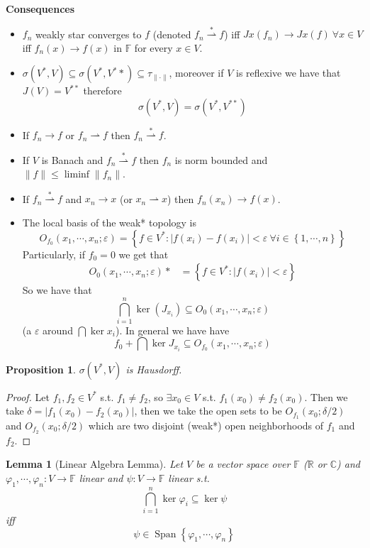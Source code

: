 \documentclass[11pt,a4paper]{article}
\theoremstyle{definition}
\theoremstyle{plain}
\newtheorem{lemma}[definition]{Lemma}
\newtheorem{proposition}[definition]{Proposition}
\theoremstyle{remark}
\newcommand{\F}{\mathbb{F}}
\newcommand{\R}{\mathbb{R}}
\newcommand{\C}{\mathbb{C}}
\renewcommand{\set}[1]{\left\{ #1 \right\}}
\newcommand{\abs}[1]{\lvert #1 \rvert}
\newcommand{\norm}[1]{\lVert #1 \rVert}
\newcommand{\1}{\mathbbm{1}}
\newcommand{\Span}{\operatorname{Span}}
\newcommand{\wto}{\rightharpoonup}
\begin{document}
\textbf{Consequences} 

\begin{itemize}
    \item $f_n$ weakly star converges to $f$ (denoted $f_n \overset{*}{\wto} f$) iff $Jx(f_n) \to Jx(f) \ \forall x \in V$ iff $f_n(x) \to f(x)$ in $\F$ for every $x \in V$.
    \item $\sigma(V^*, V) \subseteq \sigma(V^*, V^**) \subseteq \tau_{\norm{\cdot}}$, moreover if $V$ is reflexive we have that $J(V) = V^{**}$ therefore 
    $$\sigma(V^*, V) = \sigma(V^*, V^{**})$$
    \item If $f_n \to f$ or $f_n \wto f$ then $f_n \overset{*}{\wto} f$. 
    \item If $V$ is Banach and $f_n \overset{*}{\wto} f$ then $f_n$ is norm bounded and $\norm{f} \le \liminf \norm{f_n}$. 
    \item If $f_n \overset{*}{\wto} f$ and $x_n \to x$ (or $x_n \wto x$) then $f_n(x_n) \to f(x)$.  
    \item The local basis of the weak* topology is 
    $$O_{f_0} (x_1, \cdots, x_n; \varepsilon) = \set{f \in V^* \colon \abs{f(x_i) - f(x_i)} < \varepsilon \ \forall i \in \set{1, \cdots, n}}$$
    Particularly, if $f_0 = 0$ we get that 
    \begin{align*}
        O_0 (x_1, \cdots, x_n; \varepsilon) *&= \set{f \in V^* \colon \abs{f(x_i)} < \varepsilon}
    \end{align*}
    So we have that 
    $$\bigcap_{i=1}^n \ker (J_{x_i}) \subseteq O_0(x_1, \cdots, x_n; \varepsilon)$$
    (a $\varepsilon$ around $\bigcap \ker x_i$). In general we have have 
    $$f_0 + \bigcap \ker J_{x_i} \subseteq O_{f_0} (x_1, \cdots, x_n; \varepsilon)$$
\end{itemize}

\begin{proposition}
    $\sigma(V^*, V)$ is Hausdorff. 
\end{proposition}

\begin{proof}
    Let $f_1, f_2 \in V^*$ s.t. $f_1 \ne f_2$, so $\exists x_0 \in V$ s.t. $f_1(x_0) \ne f_2(x_0)$. Then we take $\delta = \abs{f_1(x_0) - f_2(x_0)}$, 
    then we take the open sets to be $O_{f_1} (x_0; \delta/2)$ and $O_{f_2} (x_0; \delta/2)$ which are two disjoint (weak*) open neighborhoods of $f_1$ and $f_2$. 
\end{proof}

\begin{lemma}[Linear Algebra Lemma]
    Let $V$ be a vector space over $\F$ ($\R$ or $\C$) and $\varphi_1, \cdots, \varphi_n \colon V \to \F$ linear and $\psi \colon V \to \F$ linear s.t. 
    $$\bigcap_{i=1}^n \ker \varphi_i \subseteq \ker \psi$$
    iff 
    $$\psi \in \Span \set{\varphi_1, \cdots, \varphi_n}$$
\end{lemma}
\end{document}
